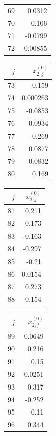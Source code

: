 {\begin{tabular}[t]{r|r}
69 & 0.0312 \\
70 & 0.106 \\
71 & -0.0799 \\
72 & -0.00855
\end{tabular}\kern4pt
\begin{tabular}[t]{r|r}
$j$ & $x^{(0)}_{2,j}$ \\\hline
73 & -0.159 \\
74 & 0.000263 \\
75 & -0.0853 \\
76 & 0.0934 \\
77 & -0.269 \\
78 & 0.0877 \\
79 & -0.0832 \\
80 & 0.169
\end{tabular}\kern4pt
\begin{tabular}[t]{r|r}
$j$ & $x^{(0)}_{2,j}$ \\\hline
81 & 0.211 \\
82 & 0.173 \\
83 & -0.163 \\
84 & -0.297 \\
85 & -0.21 \\
86 & 0.0154 \\
87 & 0.273 \\
88 & 0.154
\end{tabular}\kern4pt
\begin{tabular}[t]{r|r}
$j$ & $x^{(0)}_{2,j}$ \\\hline
89 & 0.0649 \\
90 & 0.216 \\
91 & 0.15 \\
92 & -0.0251 \\
93 & -0.317 \\
94 & -0.252 \\
95 & -0.11 \\
96 & 0.344
\end{tabular}}

